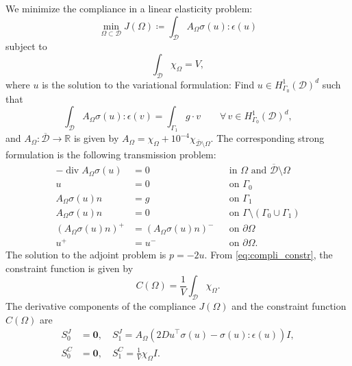 \documentclass[preprint,9pt]{elsarticle}
\begin{document}
We minimize the compliance in a linear elasticity problem:
\begin{equation} \label{eq:compli_cost}
	\min_{\Omega \subset \mathcal{D}}
	J(\Omega) \coloneqq \int_{\mathcal{D}} A_{\Omega}\sigma(u):\epsilon(u)
\end{equation}
subject to
\begin{equation}\label{eq:compli_constr}
	\int_{\mathcal{D}} \chi_{\Omega} = V,
\end{equation}
where $u$ is the solution to the variational formulation:
Find $u \in  H^1_{\Gamma_0}(\mathcal{D})^d$ such that
\begin{equation}\label{eq:compli_weak}
\int_{\mathcal{D}} A_{\Omega}\sigma(u)\colon\!\epsilon(v) =
	\int_{\Gamma_1} g\cdot v
\qquad
\forall \, v \in  H^1_{\Gamma_0}(\mathcal{D})^d,
\end{equation}
and $A_{\Omega}\colon\overline{\mathcal{D}}\to\mathds{R}$ is given by
$A_{\Omega} = \chi_{\Omega} + {10}^{-4}\chi_{\overline{\mathcal{D}}\setminus\Omega}.$
The corresponding strong formulation is the following transmission problem:
\begin{equation}\label{eq:compli_prob}
	\begin{aligned}
	   -\operatorname{div} A_{\Omega} \sigma(u) &= 0 && \text{in } \Omega \text{ and }\overline{\mathcal{D}}\setminus\Omega\\
											 u  &= 0 && \text{on } \Gamma_{0}\\
					     A_{\Omega} \sigma(u)n  &= g && \text{on } \Gamma_{1} \\
					     A_{\Omega} \sigma(u)n  &= 0 && \text{on } \Gamma \setminus (\Gamma_{0} \cup \Gamma_{1})	\\
				      (A_{\Omega} \sigma(u)n)^+ &= (A_{\Omega} \sigma(u)n)^- && \text{on }  \partial\Omega\\      
						                    u^+ &= u^- && \text{on } \partial\Omega   	.				 
	\end{aligned}
\end{equation}
The solution to the adjoint problem is $p=-2u$.
From \eqref{eq:compli_constr}, the constraint function is given by
\begin{equation*}
	C(\Omega) = \frac{1}{V} \int_{\mathcal{D}} \chi_{\Omega}.
\end{equation*} 
The derivative components of the compliance $J(\Omega)$ and the constraint function $C(\Omega)$ are
\begin{align*}
	S^J_0 &= \boldsymbol{0} ,\quad S^J_1 = A_{\Omega} (2{Du}^{\top}\sigma(u)- \sigma(u):\epsilon(u))I,\\
	S^C_0 &= \boldsymbol{0},\quad S^C_1 = \frac{1}{V} \chi_\Omega I.
\end{align*}
\end{document}
